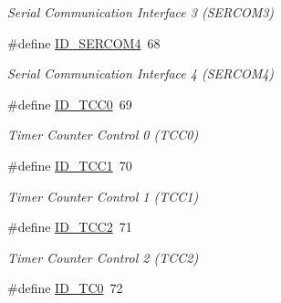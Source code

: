 \begin{DoxyCompactItemize}
\begin{DoxyCompactList}\small\item\em Serial Communication Interface 3 (S\+E\+R\+C\+O\+M3) \end{DoxyCompactList}\item 
\hypertarget{group___s_a_m_l21_j18_a__id_ga270382f699a7cc1580298bc4c32d6ce5}{}\#define \hyperlink{group___s_a_m_l21_j18_a__id_ga270382f699a7cc1580298bc4c32d6ce5}{I\+D\+\_\+\+S\+E\+R\+C\+O\+M4}~68\label{group___s_a_m_l21_j18_a__id_ga270382f699a7cc1580298bc4c32d6ce5}

\begin{DoxyCompactList}\small\item\em Serial Communication Interface 4 (S\+E\+R\+C\+O\+M4) \end{DoxyCompactList}\item 
\hypertarget{group___s_a_m_l21_j18_a__id_gae710608f4c53680eb854f146b8cfd395}{}\#define \hyperlink{group___s_a_m_l21_j18_a__id_gae710608f4c53680eb854f146b8cfd395}{I\+D\+\_\+\+T\+C\+C0}~69\label{group___s_a_m_l21_j18_a__id_gae710608f4c53680eb854f146b8cfd395}

\begin{DoxyCompactList}\small\item\em Timer Counter Control 0 (T\+C\+C0) \end{DoxyCompactList}\item 
\hypertarget{group___s_a_m_l21_j18_a__id_ga3a4b71213e54d4a617589bc14d66502f}{}\#define \hyperlink{group___s_a_m_l21_j18_a__id_ga3a4b71213e54d4a617589bc14d66502f}{I\+D\+\_\+\+T\+C\+C1}~70\label{group___s_a_m_l21_j18_a__id_ga3a4b71213e54d4a617589bc14d66502f}

\begin{DoxyCompactList}\small\item\em Timer Counter Control 1 (T\+C\+C1) \end{DoxyCompactList}\item 
\hypertarget{group___s_a_m_l21_j18_a__id_ga933f0423071b10a976b58a760fa9c2b2}{}\#define \hyperlink{group___s_a_m_l21_j18_a__id_ga933f0423071b10a976b58a760fa9c2b2}{I\+D\+\_\+\+T\+C\+C2}~71\label{group___s_a_m_l21_j18_a__id_ga933f0423071b10a976b58a760fa9c2b2}

\begin{DoxyCompactList}\small\item\em Timer Counter Control 2 (T\+C\+C2) \end{DoxyCompactList}\item 
\hypertarget{group___s_a_m_l21_j18_a__id_ga17a38517c59418d9ed3b113d2d99eb6b}{}\#define \hyperlink{group___s_a_m_l21_j18_a__id_ga17a38517c59418d9ed3b113d2d99eb6b}{I\+D\+\_\+\+T\+C0}~72\label{group___s_a_m_l21_j18_a__id_ga17a38517c59418d9ed3b113d2d99eb6b}


\end{DoxyCompactItemize}
